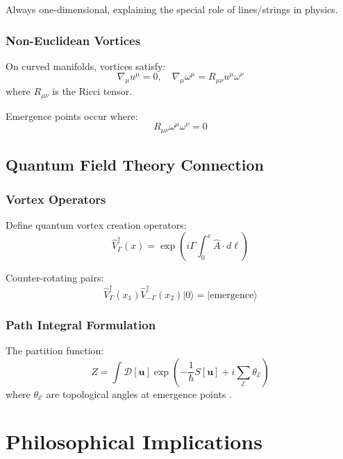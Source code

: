 \documentclass[12pt]{article}
\newcommand{\emergencept}{\mathcal{E}}
\begin{document}
Always one-dimensional, explaining the special role of lines/strings in physics.

\subsubsection{Non-Euclidean Vortices}

On curved manifolds, vortices satisfy:
\begin{equation}
\nabla_\mu u^\mu = 0, \quad \nabla_\mu \omega^\mu = R_{\mu\nu} u^\mu \omega^\nu
\end{equation}
where $R_{\mu\nu}$ is the Ricci tensor.

Emergence points occur where:
\begin{equation}
R_{\mu\nu} \omega^\mu \omega^\nu = 0
\end{equation}

\subsection{Quantum Field Theory Connection}

\subsubsection{Vortex Operators}

Define quantum vortex creation operators:
\begin{equation}
\hat{V}^\dagger_\Gamma(x) = \exp\left(i\Gamma \int_0^x \hat{A} \cdot d\ell\right)
\end{equation}

Counter-rotating pairs:
\begin{equation}
\hat{V}^\dagger_\Gamma(x_1) \hat{V}^\dagger_{-\Gamma}(x_2) |0\rangle = |\text{emergence}\rangle
\end{equation}

\subsubsection{Path Integral Formulation}

The partition function:
\begin{equation}
Z = \int \mathcal{D}[\mathbf{u}] \exp\left(-\frac{1}{\hbar} S[\mathbf{u}] + i\sum_{\emergencept} \theta_{\emergencept}\right)
\end{equation}
where $\theta_{\emergencept}$ are topological angles at emergence points \cite{witten1989}.

\section{Philosophical Implications}
\end{document}
